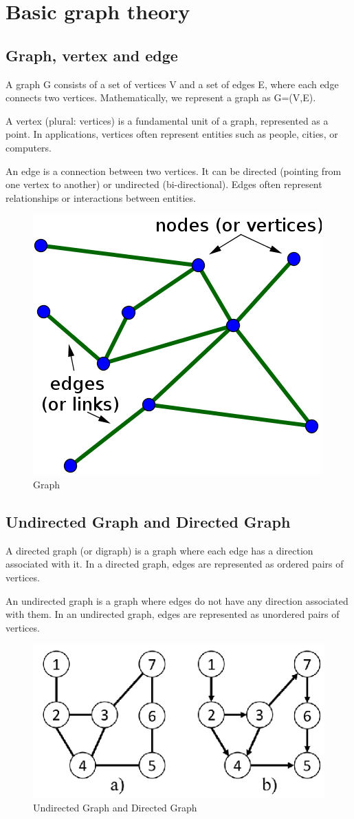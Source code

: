 \section{Basic graph theory}
\subsection{Graph, vertex and edge}
\hspace{\parindent}
A graph G consists of a set of vertices V and a set of edges E, where each edge connects two vertices. Mathematically, we represent a graph as G=(V,E).

A vertex (plural: vertices) is a fundamental unit of a graph, represented as a point. In applications, vertices often represent entities such as people, cities, or computers.

An edge is a connection between two vertices. It can be directed (pointing from one vertex to another) or undirected (bi-directional). Edges often represent relationships or interactions between entities.

\begin{figure}[H]
  \centering
  \includegraphics[width=0.4\linewidth]{graph.png}
  \caption{Graph}
  \label{fig:usecase}
\end{figure}

\subsection{Undirected Graph and Directed Graph}
\hspace{\parindent}
A directed graph (or digraph) is a graph where each edge has a direction associated with it. In a directed graph, edges are represented as ordered pairs of vertices.

An undirected graph is a graph where edges do not have any direction associated with them. In an undirected graph, edges are represented as unordered pairs of vertices.

\begin{figure}[H]
  \centering
  \includegraphics[width=0.4\linewidth]{Undirected-graph-and-b-directed-graph.png}
  \caption{Undirected Graph and Directed Graph}
  \label{fig:usecase}
\end{figure}


